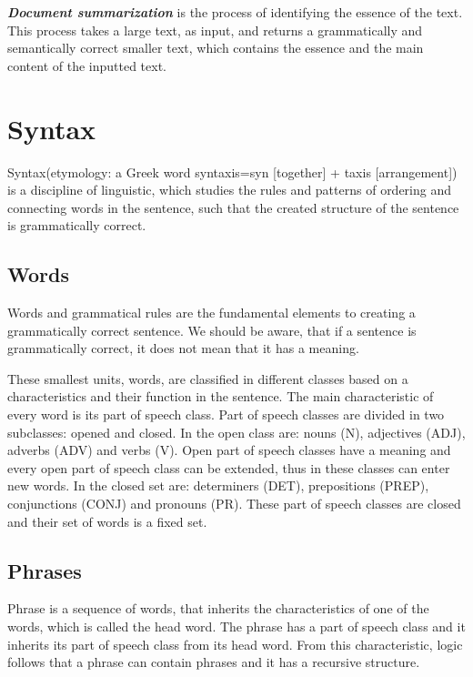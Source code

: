 \emph{\textbf{Document summarization}}  is the process of identifying the essence of the text. This process takes a large text, as input, and returns a grammatically and semantically correct smaller text, which contains the essence and the main content of the inputted text. \\

\section{Syntax}

Syntax(etymology: a Greek word syntaxis=syn [together] + taxis [arrangement]) is a discipline of linguistic, which studies the rules and patterns of ordering and connecting words in the sentence, such that the created structure of the sentence is grammatically correct.

\subsection{Words}

Words and grammatical rules are the fundamental elements to creating a grammatically correct sentence. We should be aware, that if a sentence is grammatically correct, it does not mean that it has a meaning.

These smallest units, words, are classified in different classes based on a characteristics and their function in the sentence. The main characteristic of every word is its part of speech class. Part of speech classes are divided in two subclasses: opened and closed. In the open class are: nouns (N), adjectives (ADJ), adverbs (ADV) and verbs (V). Open part of speech classes have a meaning and every open part of speech class can be extended, thus in these  classes can enter new words. In the closed set are: determiners (DET), prepositions (PREP), conjunctions (CONJ) and pronouns (PR). These part of speech classes are closed and their set of words is a fixed set.

\subsection{Phrases}

Phrase is a sequence of words, that inherits the characteristics of one of the words, which is called the head word. The phrase has a part of speech class and it inherits its part of speech class from its head word. From this characteristic, logic follows that a phrase can contain phrases and it has a recursive structure.

